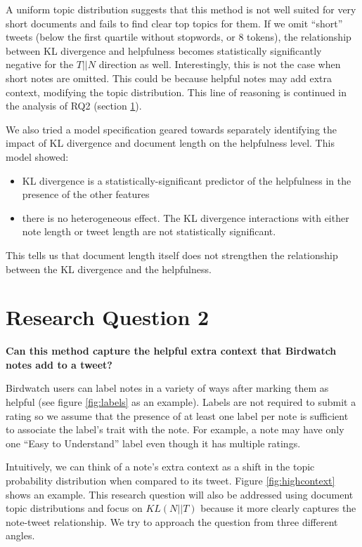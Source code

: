 \documentclass [11pt, proquest] {uwthesis}[2020/02/24]
\begin{document}
A uniform topic distribution suggests that this method is not well suited for very short documents and fails to find clear top topics for them. If we omit “short” tweets (below the first quartile without stopwords, or 8 tokens), the relationship between KL divergence and helpfulness becomes statistically significantly negative for the $T || N$  direction as well. Interestingly, this is not the case when short notes are omitted. This could be because helpful notes may add extra context, modifying the topic distribution. This line of reasoning is continued in the analysis of RQ2 (section \ref{section:RQ2}).

We also tried a model specification geared towards separately identifying the impact of KL divergence and document length on the helpfulness level. This model showed:

\begin{itemize}
    \item KL divergence is a  statistically-significant predictor of the helpfulness in the presence of the other features
    \item there is no heterogeneous effect. The KL divergence interactions with either note length or tweet length are not statistically significant.

\end{itemize}

This tells us that document length itself does not strengthen the relationship between the KL divergence and the helpfulness.

 \section{Research Question 2}\label{section:RQ2}

\textbf{Can this method capture the helpful extra context that Birdwatch notes add to a tweet?}

Birdwatch users can label notes in a variety of ways after marking them as helpful (see figure \ref{fig:labels} as an example). Labels are not required to submit a rating so we assume that the presence of at least one label per note is sufficient to associate the label’s trait with the note. For example, a note may have only one “Easy to Understand” label even though it has multiple ratings.



Intuitively, we can think of a note's extra context as a shift in the topic probability distribution when compared to its tweet. Figure \ref{fig:highcontext} shows an example. This research question will also be addressed using document topic distributions and focus on $KL(N || T)$ because it more clearly captures the note-tweet relationship. We try to approach the question from three different angles.
\end{document}

